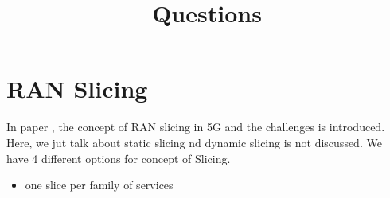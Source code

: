 \documentclass[conference]{IEEEtran}
\begin{document}
\title{Questions\vspace{-.1cm}
}
%
  \author{
  }

\maketitle

\begin{abstract}

\end{abstract}
\begin{IEEEkeywords}

\end{IEEEkeywords}
\section{RAN Slicing}
In paper \cite{elayoubi20195g}, the concept of RAN slicing in 5G and the challenges is introduced. 
Here, we jut talk about static slicing nd dynamic slicing is not discussed. We have 4 different options for concept of Slicing. 
\begin{itemize}
\item one slice per family of services
\end{itemize}



\end{document}
